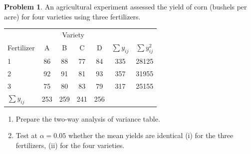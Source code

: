 \documentclass[11pt,a4paper]{article}
\theoremstyle{definition}
\newtheorem{problemx}{Problem}[section]
\newenvironment{problem}{\begin{problemx}}{\end{problemx}}
\begin{document}
\begin{problem}
An agricultural experiment assessed the yield of corn (bushels per acre) for four varieties
using three fertilizers.
\begin{table}[H]
\centering
\begin{tabular}{|l|c|c|c|c|c|c|}
\hline
& \multicolumn{4}{c|}{Variety} & & \\
Fertilizer & A & B & C & D & $\sum y_{ij}$ & $\sum y_{ij}^2$\\
\hline
1 & 86 & 88 & 77 & 84 & 335 & 28125\\
2 & 92 & 91 & 81 & 93 & 357 & 31955\\
3 & 75 & 80 & 83 & 79 & 317 & 25155\\
\hline
$\sum y_{ij}$ & 253 & 259 & 241 & 256 & & \\
\hline
\end{tabular}
\end{table}
\begin{enumerate}
\item[(a).] Prepare the two-way analysis of variance table.
\item[(b).] Test at $\alpha=0.05$ whether the mean yields are identical (i) for the three
fertilizers, (ii) for the four varieties.
\end{enumerate}
\end{problem}
\end{document}
